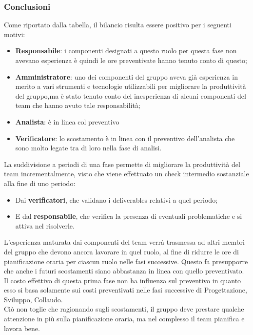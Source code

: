 \subsubsection{Conclusioni}
Come riportato dalla tabella, il bilancio risulta essere positivo per i seguenti motivi:
\begin{itemize}
	\item \textbf{Responsabile}: {i componenti designati a questo ruolo per questa fase non avevano esperienza è quindi le ore preventivate hanno tenuto conto di questo; }
	\item \textbf{Amministratore}: {uno dei componenti del gruppo aveva già esperienza in merito a vari strumenti e tecnologie utilizzabili per migliorare la produttività del gruppo,ma è stato tenuto 
	conto del inesperienza di alcuni componenti del team che hanno avuto tale responsabilità;}
	\item \textbf{Analista}: {è in linea col preventivo}
	\item \textbf{Verificatore}: {lo scostamento è in linea con il preventivo dell'analista che sono molto legate tra di loro nella fase di analisi.}
\end{itemize}
La suddivisione a periodi di una fase permette di migliorare la produttività del team incrementalmente, visto che viene effettuato un check intermedio sostanziale alla fine di uno periodo:
\begin{itemize}
	\item Dai \textbf{verificatori}, che validano i deliverables relativi a quel periodo;
	\item E dal \textbf{responsabile}, che verifica la presenza di eventuali problematiche e si attiva nel risolverle.
\end{itemize}
L'esperienza maturata dai componenti del team verrà trasmessa ad altri membri del gruppo che devono ancora lavorare in quel ruolo, al fine di ridurre le ore di pianificazione oraria per ciascun ruolo nelle fasi successive.
Questo fa presupporre che anche i futuri scostamenti siano abbastanza in linea con quello preventivato.
Il costo effettivo di questa prima fase non ha influenza sul preventivo in quanto esso si basa solamente sui costi preventivati nelle fasi successive di Progettazione, Sviluppo, Collaudo.\\
Ciò non toglie che ragionando sugli scostamenti, il gruppo deve prestare qualche attenzione in più sulla pianificazione oraria, ma nel complesso il team pianifica e lavora bene.

